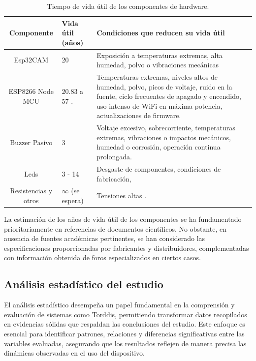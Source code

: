 				\begin{table}[h]
					\centering
					\caption{Tiempo de vida útil de los componentes de hardware.}
					\label{tab:ShelfLife}
					\begin{tabularx}{\textwidth}{cXX}
						\toprule
						\textbf{Componente} & \textbf{Vida útil (años)} & Condiciones que reducen su vida útil\\
						\midrule
						Esp32CAM & 20 \citep{Espressif2022ESP32-CAM,Espressif2022ESP32Forum} & Exposición a temperaturas extremas, alta humedad, polvo o vibraciones mecánicas\\
						ESP8266 Node MCU & 20.83 \citep{Amri2018Improving} a 57 \citep{Ardumotica2023,Espressif2022ESP32Forum}. & Temperaturas extremas, niveles altos de humedad, polvo, picos de voltaje, ruido en la fuente, ciclo frecuentes de apagado y encendido, uso intenso de WiFi en máxima potencia, actualizaciones de firmware.\\
						Buzzer Pasivo & 3 \citep{HuawhaElectronics} & Voltaje excesivo, sobrecorriente, temperaturas extremas, vibraciones o impactos mecánicos, humedad o corrosión, operación continua prolongada. \\
						Leds & 3 \citep{Casamayor2015} - 14 \citep{Cary,GreenLighting2024} & Desgaste de componentes, condiciones de fabricación, \\
						Resistencias y otros & $\infty$ (se espera) & Tensiones altas \citep{Simon2017Evolution}. \\
						\bottomrule
					\end{tabularx}
				\end{table}
				La estimación de los años de vida útil de los componentes se ha fundamentado prioritariamente en referencias de documentos científicos. No obstante, en ausencia de fuentes académicas pertinentes, se han considerado las especificaciones proporcionadas por fabricantes y distribuidores, complementadas con información obtenida de foros especializados en ciertos casos.
		
		\subsection{Análisis estadístico del estudio}
			El análisis estadístico desempeña un papel fundamental en la comprensión y evaluación de sistemas como Torddis, permitiendo transformar datos recopilados en evidencias sólidas que respaldan las conclusiones del estudio. Este enfoque es esencial para identificar patrones, relaciones y diferencias significativas entre las variables evaluadas, asegurando que los resultados reflejen de manera precisa las dinámicas observadas en el uso del dispositivo.
			
